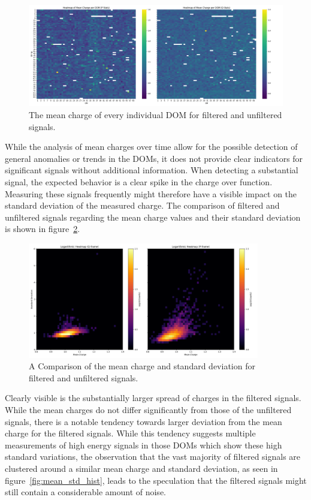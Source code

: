 \begin{figure}[H]
    \centering
    \includegraphics[width=\textwidth]{Plots/mean_charge_all_dom.png}
    \caption{The mean charge of every individual DOM for filtered and unfiltered signals.}
    \label{fig:mean_dom_charge_pq}
\end{figure}

While the analysis of mean charges over time allow for the possible detection of general anomalies or trends in the DOMs, it does not provide clear indicators for 
significant signals without additional information. When detecting a substantial signal, the expected behavior is a clear spike in the charge over function. 
Measuring these signals frequently might therefore have a visible impact on the standard deviation of the measured charge. The comparison of filtered and unfiltered 
signals regarding the mean charge values and their standard deviation is shown in figure~\ref{fig:mean_std_comp}.

\begin{figure}[H]
    \centering
    \includegraphics[width=0.9\textwidth]{Plots/mean_std_charge.png}
    \caption{A Comparison of the mean charge and standard deviation for filtered and unfiltered signals.}
    \label{fig:mean_std_comp}
\end{figure}

Clearly visible is the substantially larger spread of charges in the filtered signals. While the mean charges do not differ significantly from those of the 
unfiltered signals, there is a notable tendency towards larger deviation from the mean charge for the filtered signals. 
While this tendency suggests multiple measurements of high energy signals in those DOMs which show these high standard variations, the observation that the vast 
majority of filtered signals are clustered around a similar mean charge and standard deviation, as seen in figure~\ref{fig:mean_std_hist}, leads to the speculation 
that the filtered signals might still contain a considerable amount of noise.

